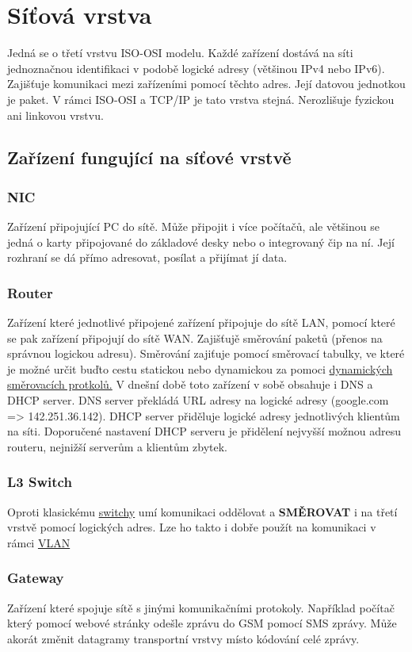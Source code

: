 \section{Síťová vrstva}
\label{sec:sitova-vrstva}
Jedná se o třetí vrstvu ISO-OSI modelu.
Každé zařízení dostává na síti jednoznačnou identifikaci v podobě logické adresy (většinou IPv4 nebo IPv6).
Zajišťuje komunikaci mezi zařízeními pomocí těchto adres.
Její datovou jednotkou je paket.
V rámci ISO-OSI a TCP/IP je tato vrstva stejná.
Nerozlišuje fyzickou ani linkovou vrstvu.
\subsection{Zařízení fungující na síťové vrstvě}
\subsubsection{NIC}
Zařízení připojující PC do sítě.
Může připojit i více počítačů, ale většinou se jedná o karty připojované do základové desky nebo o integrovaný čip na ní.
Její rozhraní se dá přímo adresovat, posílat a přijímat jí data.
\subsubsection{Router}
Zařízení které jednotlivé připojené zařízení připojuje do sítě LAN, pomocí které se pak zařízení připojují do sítě WAN.
Zajišťujě směrování paketů (přenos na správnou logickou adresu).
Směrování zajiťuje pomocí směrovací tabulky, ve které je možné určit buďto cestu statickou nebo dynamickou za pomoci \hyperref[sec:smerovaci-protokoly]{dynamických směrovacích protkolů.}
V dnešní době toto zařízení v sobě obsahuje i DNS a DHCP server.
DNS server překládá URL adresy na logické adresy (google.com => 142.251.36.142).
DHCP server přiděluje logické adresy jednotlivých klientům na síti.
Doporučené nastavení DHCP serveru je přidělení nejvyšší možnou adresu routeru, nejnižší serverům a klientům zbytek.
\subsubsection{L3 Switch}
Oproti klasickému \hyperref[subsubsec:switch]{switchy} umí komunikaci oddělovat a \textbf{SMĚROVAT} i na třetí vrstvě pomocí logických adres.
Lze ho takto i dobře použít na komunikaci v rámci \hyperref[sec:vlan]{VLAN}
\subsubsection{Gateway}
Zařízení které spojuje sítě s jinými komunikačními protokoly.
Například počítač který pomocí webové stránky odešle zprávu do GSM pomocí SMS zprávy.
Může akorát změnit datagramy transportní vrstvy místo kódování celé zprávy.
